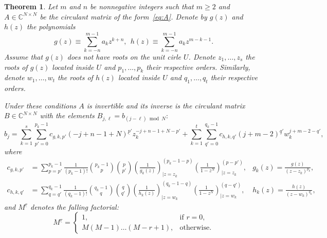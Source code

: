 \documentclass[a4paper]{article}
\newtheorem{theorem}{Theorem}[section]
\begin{document}
	\begin{theorem}\label{thm:general-inverse}
	Let $m$ and $n$ be nonnegative integers such that $m \ge 2$ and $A \in \mathbb{C}^{N\times N}$ be the circulant matrix of the form~\eqref{eq:A}.
	Denote by $g(z)$ and $h(z)$ the polynomials
	\[
	g(z) \equiv \sum_{k=-n}^{m-1}a_{k}z^{k+n},~~h(z) \equiv \sum_{k=-n}^{m-1}a_{k}z^{m-k-1}.
	\]
	Assume that $g(z)$ does not have roots on the unit cirle $U$.
	Denote $z_1, \dots, z_s$ the roots of $g(z)$ located inside $U$ and $p_1, \dots, p_k$ their respective orders.
	Similarly, denote $w_1, \dots, w_t$ the roots of $h(z)$ located inside $U$ and $q_1, \dots, q_t$ their respective orders.
	
	Under these conditions $A$ is invertible and its inverse is the circulant matrix $B\in\mathbb{C}^{N\times N}$ with the elements $B_{j,\ell} = b_{(j-\ell)\bmod N}:$
	\[
	b_j
	=
	\sum_{k=1}^s\sum_{p'=0}^{p_k-1}
	c_{g,k,p'}
	(-j+n-1+N)^{\underline{p}'} z_k^{-j+n-1+N-p'}
	+
	\sum_{k=1}^t\sum_{q'=0}^{q_k-1}
	c_{h,k,q'}
	(j+m-2)^{\underline{q}'}w_k^{j+m-2-q'},
	\]
	where
	\begin{align*}
    c_{g,k,p'}
	    &=
    \sum_{p=p'}^{p_k-1}\frac{1}{(p_k - 1)!}\binom{p_k-1}{p}\binom{p}{p'}
	\left(\frac{1}{g_k(z)}\right)^{(p_k-1-p)}_{\big|{z=z_k}}
	\left(\frac{1}{1-z^{N}}\right)^{(p-p')}_{\big|{z=z_k}},
	&
	g_k(z) = \frac{g(z)}{(z-z_k)^{p_k}},
	\\
	c_{h,k,q'}
	    &=
	\sum_{q=q'}^{q_k-1}
	\frac{1}{(q_k - 1)!}\binom{q_k-1}{q}\binom{q}{q'}
	\left(\frac{1}{h_k(z)}\right)^{(q_k-1-q)}_{\big|{z=w_k}}
	\left(\frac{1}{1-z^{N}}\right)^{(q-q')}_{\big|{z=w_k}},
	&
	h_k(z) = \frac{h(z)}{(z-w_k)^{q_k}},
	\end{align*}
	and
	$M^{\underline{r}}$ denotes the falling factorial:
	\[
	M^{\underline{r}} = 
	\begin{cases}
	1, & \text{if } r = 0, \\
	M(M-1)\dots(M-r+1), & \text{otherwise}.
	\end{cases}
	\]
	\end{theorem}
	
\end{document}
